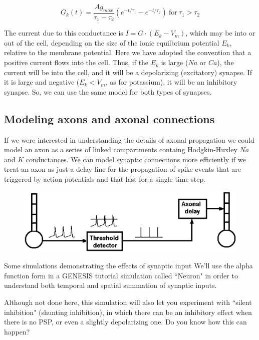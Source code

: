\documentclass[12pt]{article}
\begin{document}
\begin{displaymath}
	G_k(t) = \frac{Ag_{max}}{\tau_1 - \tau_2}(e^{-t/\tau_1} - e^{-t/\tau_2}) \mathrm{~for~} \tau_1 > \tau_2
\end{displaymath}

The current due to this conductance is $I = G\cdot (E_k - V_m)$, which may be into or out of the cell, depending on the size of the ionic equilbrium potential $E_k$, relative to the membrane potential. Here we have adopted the convention that a positive current flows into the cell. Thus, if the $E_k$ is large ($Na$ or $Ca$), the current will be into the cell, and it will be a depolarizing (excitatory) synapse. If it is large and negative ($E_k < V_m$, as for potassium), it will be an inhibitory synapse. So, we can use the same model for both types of synapses.

\subsection*{Modeling axons and axonal connections}

If we were interested in understanding the details of axonal propagation we could model an axon as a series of linked compartments containg Hodgkin-Huxley $Na$ and $K$ conductances. We can model synaptic connections more efficiently if we treat an axon as just a delay line for the propagation of spike events that are triggered by action potentials and that last for a single time step.

\begin{figure}[h]
  \centering
 \includegraphics[scale=0.5]{figs/syn-connect.eps}
  \label{fig:synconnect}
\end{figure}

Some simulations demonstrating the effects of synaptic input
We'll use the alpha function form in a GENESIS tutorial simulation called ``Neuron" in order to understand both temporal and spatial summation of synaptic inputs.

Although not done here, this simulation will also let you experiment with ``silent inhibition" (shunting inhibition), in which there can be an inhibitory effect when there is no PSP, or even a slightly depolarizing one. Do you know how this can happen?
\end{document}
